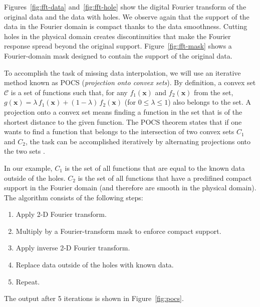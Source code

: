 Figures~\ref{fig:fft-data} and~\ref{fig:fft-hole} show the digital
Fourier transform of the original data and the data with holes. We
observe again that the support of the data in the Fourier domain is
compact thanks to the data smoothness. Cutting holes in the physical
domain creates discontinuities that make the Fourier response spread
beyond the original support. Figure~\ref{fig:fft-mask} shows a
Fourier-domain mask designed to contain the support of the original
data.

To accomplish the task of missing data interpolation, we will use an
iterative method known as POCS (\emph{projection onto convex
sets}). By definition, a convex set $\mathcal{C}$ is a set of
functions such that, for any $f_1(\mathbf{x})$ and $f_2(\mathbf{x})$
from the set, $g(\mathbf{x}) = \lambda\,f_1(\mathbf{x}) +
(1-\lambda)\,f_2(\mathbf{x})$ (for $0 \le \lambda \le 1$) also belongs
to the set. A projection onto a convex set means finding a function in
the set that is of the shortest distance to the given function. The
POCS theorem states that if one wants to find a function that belongs
to the intersection of two convex sets $C_1$ and $C_2$, the task can
be accomplished iteratively by alternating projections onto the two
sets \cite[]{youla}.

In our example, $C_1$ is the set of all functions that are equal to
the known data outside of the holes. $C_2$ is the set of all functions
that have a predifined compact support in the Fourier domain (and
therefore are smooth in the physical domain). The algorithm consists
of the following steps:
\begin{enumerate}
\item Apply 2-D Fourier transform. 
\item Multiply by a Fourier-transform mask to enforce compact support.
\item Apply inverse 2-D Fourier transform.
\item Replace data outside of the holes with known data.
\item Repeat.
\end{enumerate}
The output after 5 iterations is shown in Figure~\ref{fig:pocs}.




